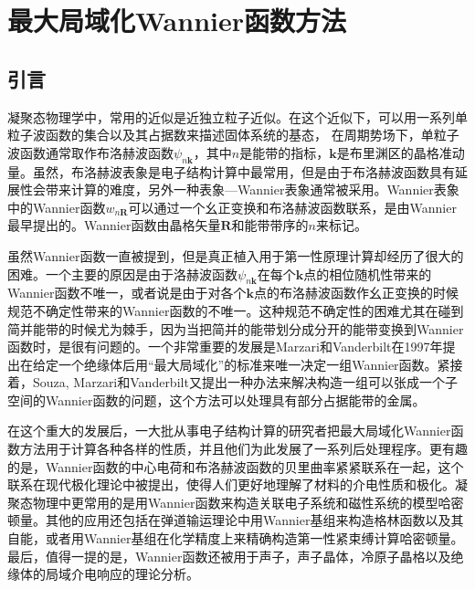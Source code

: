 \section{最大局域化Wannier函数方法}
\subsection{引言}
凝聚态物理学中，常用的近似是近独立粒子近似。在这个近似下，可以用一系列单粒子波函数的集合以及其占据数来描述固体系统的基态，
在周期势场下，单粒子波函数通常取作布洛赫波函数$\psi_{n\bm{k}}$，其中$n$是能带的指标，$\bm{k}$是布里渊区的晶格准动量。虽然，布洛赫波表象是电子结构计算中最常用，但是由于布洛赫波函数具有延展性会带来计算的难度，另外一种表象—Wannier表象通常被采用。Wannier表象中的Wannier函数$w_{n\bm{R}}$可以通过一个幺正变换和布洛赫波函数联系，是由Wannier最早提出的。Wannier函数由晶格矢量$\bm{R}$和能带带序的$n$来标记。

虽然Wannier函数一直被提到，但是真正植入用于第一性原理计算却经历了很大的困难。一个主要的原因是由于洛赫波函数$\psi_{n\bm{k}}$在每个$\bm{k}$点的相位随机性带来的Wannier函数不唯一，或者说是由于对各个$\bm{k}$点的布洛赫波函数作幺正变换的时候规范不确定性带来的Wannier函数的不唯一。这种规范不确定性的困难尤其在碰到简并能带的时候尤为棘手，因为当把简并的能带划分成分开的能带变换到Wannier函数时，是很有问题的。一个非常重要的发展是Marzari和Vanderbilt\cite{marzari_maximally_2012}在1997年提出在给定一个绝缘体后用“最大局域化”的标准来唯一决定一组Wannier函数。紧接着，Souza, Marzari和Vanderbilt\cite{souza_maximally-localized_2001}又提出一种办法来解决构造一组可以张成一个子空间的Wannier函数的问题，这个方法可以处理具有部分占据能带的金属。

在这个重大的发展后，一大批从事电子结构计算的研究者把最大局域化Wannier函数方法用于计算各种各样的性质，并且他们为此发展了一系列后处理程序。更有趣的是，Wannier函数的中心电荷和布洛赫波函数的贝里曲率紧紧联系在一起，这个联系在现代极化理论中被提出，使得人们更好地理解了材料的介电性质和极化\cite{king-smith_theory_1993}。凝聚态物理中更常用的是用Wannier函数来构造关联电子系统和磁性系统的模型哈密顿量。其他的应用还包括在弹道输运理论中用Wannier基组来构造格林函数以及其自能，或者用Wannier基组在化学精度上来精确构造第一性紧束缚计算哈密顿量。最后，值得一提的是，Wannier函数还被用于声子，声子晶体，冷原子晶格以及绝缘体的局域介电响应的理论分析。

